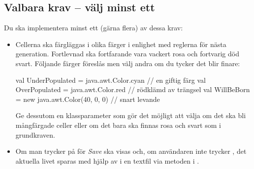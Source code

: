 \subsection{Valbara krav -- välj minst ett}

Du ska implementera minst ett (gärna flera) av dessa krav:
\begin{itemize}[nosep, label={$\square$}]
\item Cellerna ska färgläggas i olika färger i enlighet med reglerna för nästa generation. Fortlevnad ska fortfarande vara vackert rosa och fortvarig död svart. Följande färger föreslås men välj andra om du tycker det blir finare:
\begin{CodeSmall}
  val UnderPopulated = java.awt.Color.cyan  // en giftig färg
  val OverPopulated  = java.awt.Color.red   // rödklämd av trängsel
  val WillBeBorn     = new java.awt.Color(40, 0, 0)  // snart levande
\end{CodeSmall}
Ge dessutom  en klassparameter  som gör det möjligt att välja om det ska bli mångfärgade celler eller om det bara ska finnas rosa och svart som i grundkraven.

\item Om man trycker på  för \emph{Save} ska  visas och, om användaren inte trycker , det aktuella livet sparas med hjälp av\newline {} i en textfil via metoden  i .


\end{itemize}
